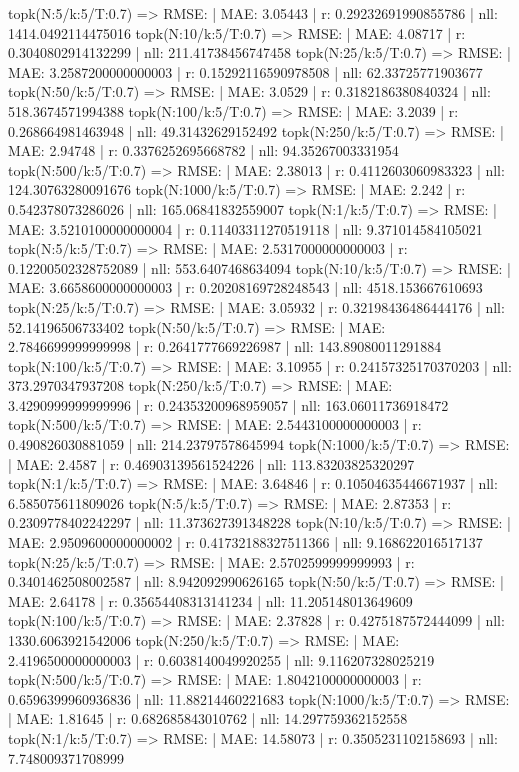 topk(N:5/k:5/T:0.7) => RMSE: | MAE: 3.05443 | r: 0.29232691990855786 | nll: 1414.0492114475016
topk(N:10/k:5/T:0.7) => RMSE: | MAE: 4.08717 | r: 0.3040802914132299 | nll: 211.41738456747458
topk(N:25/k:5/T:0.7) => RMSE: | MAE: 3.2587200000000003 | r: 0.15292116590978508 | nll: 62.33725771903677
topk(N:50/k:5/T:0.7) => RMSE: | MAE: 3.0529 | r: 0.3182186380840324 | nll: 518.3674571994388
topk(N:100/k:5/T:0.7) => RMSE: | MAE: 3.2039 | r: 0.268664981463948 | nll: 49.31432629152492
topk(N:250/k:5/T:0.7) => RMSE: | MAE: 2.94748 | r: 0.3376252695668782 | nll: 94.35267003331954
topk(N:500/k:5/T:0.7) => RMSE: | MAE: 2.38013 | r: 0.4112603060983323 | nll: 124.30763280091676
topk(N:1000/k:5/T:0.7) => RMSE: | MAE: 2.242 | r: 0.542378073286026 | nll: 165.06841832559007
topk(N:1/k:5/T:0.7) => RMSE: | MAE: 3.5210100000000004 | r: 0.11403311270519118 | nll: 9.371014584105021
topk(N:5/k:5/T:0.7) => RMSE: | MAE: 2.5317000000000003 | r: 0.12200502328752089 | nll: 553.6407468634094
topk(N:10/k:5/T:0.7) => RMSE: | MAE: 3.6658600000000003 | r: 0.20208169728248543 | nll: 4518.153667610693
topk(N:25/k:5/T:0.7) => RMSE: | MAE: 3.05932 | r: 0.32198436486444176 | nll: 52.14196506733402
topk(N:50/k:5/T:0.7) => RMSE: | MAE: 2.7846699999999998 | r: 0.2641777669226987 | nll: 143.89080011291884
topk(N:100/k:5/T:0.7) => RMSE: | MAE: 3.10955 | r: 0.24157325170370203 | nll: 373.2970347937208
topk(N:250/k:5/T:0.7) => RMSE: | MAE: 3.4290999999999996 | r: 0.24353200968959057 | nll: 163.06011736918472
topk(N:500/k:5/T:0.7) => RMSE: | MAE: 2.5443100000000003 | r: 0.490826030881059 | nll: 214.23797578645994
topk(N:1000/k:5/T:0.7) => RMSE: | MAE: 2.4587 | r: 0.46903139561524226 | nll: 113.83203825320297
topk(N:1/k:5/T:0.7) => RMSE: | MAE: 3.64846 | r: 0.10504635446671937 | nll: 6.585075611809026
topk(N:5/k:5/T:0.7) => RMSE: | MAE: 2.87353 | r: 0.2309778402242297 | nll: 11.373627391348228
topk(N:10/k:5/T:0.7) => RMSE: | MAE: 2.9509600000000002 | r: 0.41732188327511366 | nll: 9.168622016517137
topk(N:25/k:5/T:0.7) => RMSE: | MAE: 2.5702599999999993 | r: 0.3401462508002587 | nll: 8.942092990626165
topk(N:50/k:5/T:0.7) => RMSE: | MAE: 2.64178 | r: 0.35654408313141234 | nll: 11.205148013649609
topk(N:100/k:5/T:0.7) => RMSE: | MAE: 2.37828 | r: 0.4275187572444099 | nll: 1330.6063921542006
topk(N:250/k:5/T:0.7) => RMSE: | MAE: 2.4196500000000003 | r: 0.6038140049920255 | nll: 9.116207328025219
topk(N:500/k:5/T:0.7) => RMSE: | MAE: 1.8042100000000003 | r: 0.6596399960936836 | nll: 11.88214460221683
topk(N:1000/k:5/T:0.7) => RMSE: | MAE: 1.81645 | r: 0.682685843010762 | nll: 14.297759362152558
topk(N:1/k:5/T:0.7) => RMSE: | MAE: 14.58073 | r: 0.3505231102158693 | nll: 7.748009371708999
